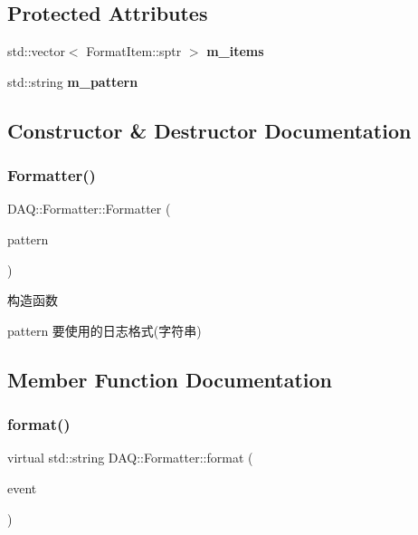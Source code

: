 \subsection*{Protected Attributes}
\begin{DoxyCompactItemize}
\item 
\mbox{\label{classDAQ_1_1Formatter_a77057c0d652ded75e9877fbfb7f1c8bf}} 
std\+::vector$<$ Format\+Item\+::sptr $>$ {\bfseries m\+\_\+items}
\item 
\mbox{\label{classDAQ_1_1Formatter_a13694557ba01041f21e8324522b6de1f}} 
std\+::string {\bfseries m\+\_\+pattern}
\end{DoxyCompactItemize}


\subsection{Constructor \& Destructor Documentation}
\mbox{\label{classDAQ_1_1Formatter_a4b0b8f984b2f0bfe9fc73982c00d8d62}} 
\subsubsection{\texorpdfstring{Formatter()}{Formatter()}}
{\footnotesize\ttfamily D\+A\+Q\+::\+Formatter\+::\+Formatter (\begin{DoxyParamCaption}\item[{const std\+::string \&}]{pattern }\end{DoxyParamCaption})}



构造函数 

pattern 要使用的日志格式(字符串) 

\subsection{Member Function Documentation}
\mbox{\label{classDAQ_1_1Formatter_a76cd0f04adcfac5c592a57eba8a01a8f}} 
\subsubsection{\texorpdfstring{format()}{format()}}
{\footnotesize\ttfamily virtual std\+::string D\+A\+Q\+::\+Formatter\+::format (\begin{DoxyParamCaption}\item[{Log\+Event\+::sptr}]{event }\end{DoxyParamCaption})\hspace{0.3cm}{\ttfamily [virtual]}}



